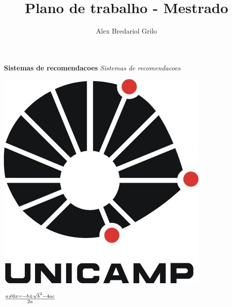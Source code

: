 \documentclass{article}
\title{Plano de trabalho - Mestrado}
\author{Alex Bredariol Grilo}
\begin{document}
\maketitle
\textbf{Sistemas de recomendacoes}
\textit{Sistemas de recomendacoes}

 \includegraphics{teste.jpg}


$a \ne 0 x =  -b \pm \sqrt  b^2-4ac  \over 2a  $
\end{document}
